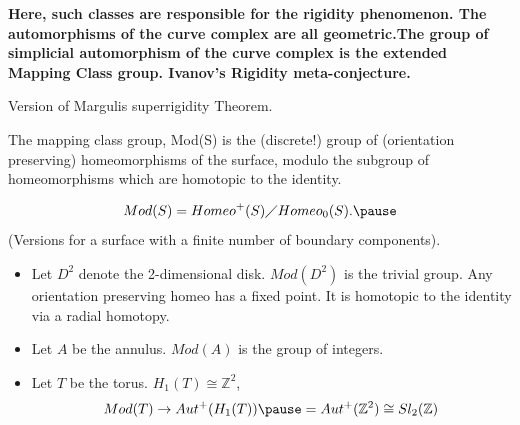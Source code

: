 \documentclass[handout]{beamer}
\theoremstyle{plain}
\begin{document}
\begin{frame}
\textbf{Here, such classes  are  responsible  for  the  rigidity  phenomenon. The  automorphisms  of  the  curve  complex  are  all geometric.\pause  The  group  of simplicial   automorphism  of  the  curve  complex  is  the  extended  Mapping  Class group. \pause Ivanov's Rigidity  meta-conjecture.}

Version  of  Margulis superrigidity Theorem. 
 

\end{frame}


\begin{frame}

\begin{definition}
The  mapping class group, Mod(S) is the  (discrete!) group  of  (orientation preserving) homeomorphisms of  the  surface, modulo  the subgroup of homeomorphisms  which  are  homotopic  to  the  identity. \pause

$$ Mod(S)= Homeo^{+}(S)\diagup Homeo_{0}(S). \pause $$
(Versions for  a  surface with  a  finite  number  of boundary  components). 
 
 \end{definition}
 \end{frame}
 
\begin{frame}

\begin{example}
\begin{itemize}

\item Let $D^2$ denote  the  2-dimensional  disk. $Mod(D^2)$ is  the  trivial  group. Any orientation preserving  homeo  has  a  fixed  point. \pause It  is homotopic  to  the  identity  via  a  radial homotopy. \pause
\item Let  $A$  be  the  annulus. $Mod(A)$ is  the group  of  integers. \pause 
\item Let $T$ be  the  torus. \pause  $H_1(T)\cong \mathbb{Z}^2$, \pause 
$$Mod(T) \to Aut^{+}(H_{1}(T))\pause = Aut^{+}(\mathbb{Z}^2)\cong Sl_2(\mathbb{Z}) $$ 
\end{itemize}
\end{example}
\end{frame}
\end{document}
